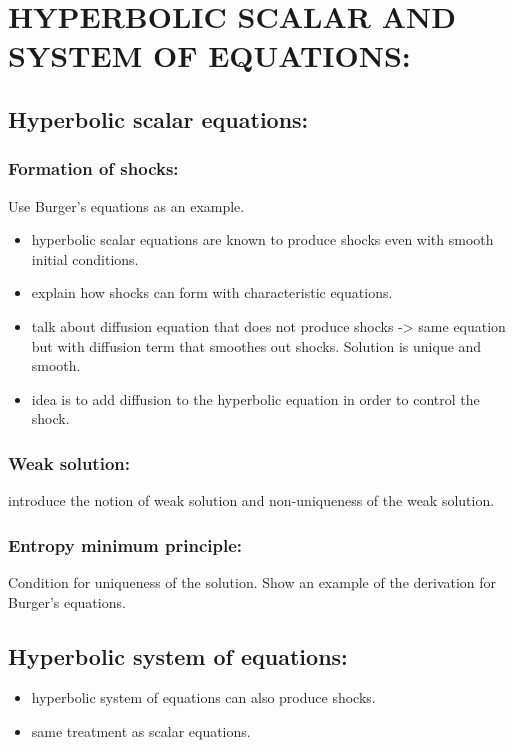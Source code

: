 %
%
%


\pagestyle{plain} %
\setcounter{page}{1}

\chapter{\uppercase {Hyperbolic scalar and system of equations:}}
%
\section{Hyperbolic scalar equations:}
%
\subsection{Formation of shocks:}
Use Burger's equations as an example.
\begin{itemize}
\item hyperbolic scalar equations are known to produce shocks even with smooth initial conditions.
\item explain how shocks can form with characteristic equations.
\item talk about diffusion equation that does not produce shocks -> same equation but with diffusion term that smoothes out shocks. Solution is unique and smooth.
\item idea is to add diffusion to the hyperbolic equation in order to control the shock.
\end{itemize}
%
\subsection{Weak solution:}
introduce the notion of weak solution and non-uniqueness of the weak solution.
%
\subsection{Entropy minimum principle:}
Condition for uniqueness of the solution. Show an example of the derivation for Burger's equations.
%
\section{Hyperbolic system of equations:}
%
\begin{itemize}
\item hyperbolic system of equations can also produce shocks.
\item same treatment as scalar equations.
\end{itemize}